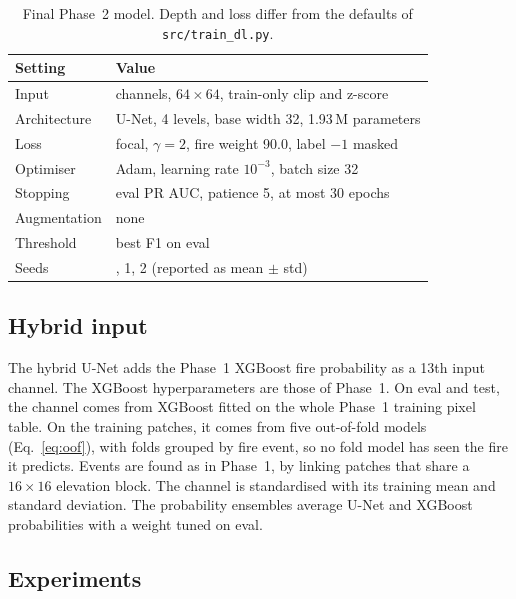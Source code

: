 \begin{table}[t]
\centering
\caption{Final Phase~2 model. Depth and loss differ from the defaults of \texttt{src/train\_dl.py}.}
\label{tab:dl_final}
\footnotesize
\renewcommand{\arraystretch}{1.1}
\begin{tabular}{l>{\raggedright\arraybackslash}p{5.9cm}}
\toprule
\rowcolor{tblhead}
\textbf{Setting} & \textbf{Value} \\
\midrule
Input & 12 channels, $64\times64$, train-only clip and z-score \\
Architecture & U-Net, 4 levels, base width 32, 1.93\,M parameters \\
Loss & focal, $\gamma = 2$, fire weight 90.0, label $-1$ masked \\
Optimiser & Adam, learning rate $10^{-3}$, batch size 32 \\
Stopping & eval PR AUC, patience 5, at most 30 epochs \\
Augmentation & none \\
Threshold & best F1 on eval \\
Seeds & 0, 1, 2 (reported as mean $\pm$ std) \\
\bottomrule
\end{tabular}
\end{table}

\subsection{Hybrid input}

The hybrid U-Net adds the Phase~1 XGBoost fire probability as a 13th input channel. The XGBoost
hyperparameters are those of Phase~1. On eval and test, the channel comes from XGBoost fitted on the whole
Phase~1 training pixel table. On the training patches, it comes from five out-of-fold models (Eq.~\ref{eq:oof}),
with folds grouped by fire event, so no fold model has seen the fire it predicts. Events are found as in
Phase~1, by linking patches that share a $16\times16$ elevation block. The channel is standardised with its
training mean and standard deviation. The probability ensembles average U-Net and XGBoost probabilities
with a weight tuned on eval.

\subsection{Experiments}


